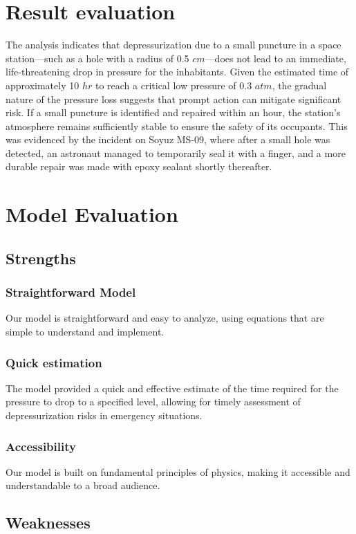 \documentclass[a4paper, 14pt]{extarticle}
\begin{document}
\section{Result evaluation}
The analysis indicates that depressurization due to a small puncture in a space station—such as a hole with a radius of 0.5 $cm$—does not lead to an immediate, life-threatening drop in pressure for the inhabitants. Given the estimated time of approximately 10 $hr$ to reach a critical low pressure of 0.3 $atm$, the gradual nature of the pressure loss suggests that prompt action can mitigate significant risk. If a small puncture is identified and repaired within an hour, the station's atmosphere remains sufficiently stable to ensure the safety of its occupants. This was evidenced by the incident on Soyuz MS-09, where after a small hole was detected, an astronaut managed to temporarily seal it with a finger, and a more durable repair was made with epoxy sealant shortly thereafter.

\section{Model Evaluation}
\subsection{Strengths}
\subsubsection*{Straightforward Model}
Our model is straightforward and easy to analyze, using equations that are simple to understand and implement.
\subsubsection*{Quick estimation}
The model provided a quick and effective estimate of the time required for the pressure to drop to a specified level, allowing for timely assessment of depressurization risks in emergency situations.
\subsubsection*{Accessibility}
Our model is built on fundamental principles of physics, making it accessible and understandable to a broad audience. 

\subsection{Weaknesses}
\end{document}
